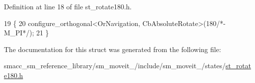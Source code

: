 Definition at line 18 of file st\+\_\+rotate180.\+h.


\begin{DoxyCode}
19     \{
20         configure\_orthogonal<OrNavigation, CbAbsoluteRotate>(180\textcolor{comment}{/*-M\_PI*/});
21     \}
\end{DoxyCode}


The documentation for this struct was generated from the following file\+:\begin{DoxyCompactItemize}
\item 
smacc\+\_\+sm\+\_\+reference\+\_\+library/sm\+\_\+moveit\+\_/include/sm\+\_\+moveit\+\_/states/\hyperlink{2_2include_2sm__moveit__2_2states_2st__rotate180_8h}{st\+\_\+rotate180.\+h}\end{DoxyCompactItemize}
